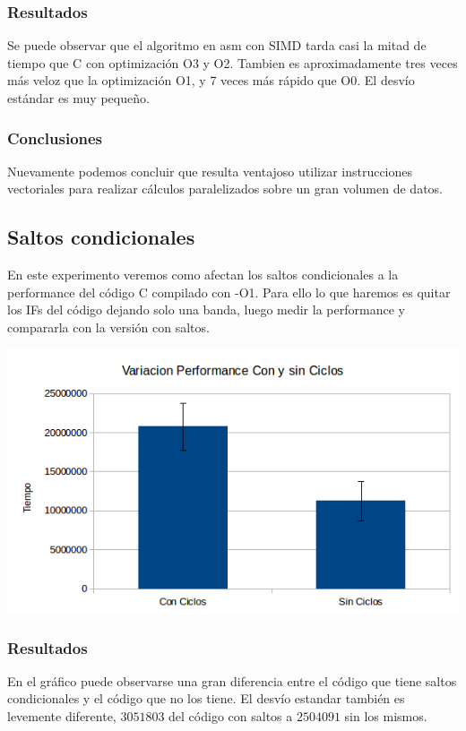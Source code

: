 \documentclass[a4paper]{article}
\begin{document}
\subsubsection{Resultados}
Se puede observar que el algoritmo en asm con SIMD tarda casi la mitad de tiempo que C con optimización O3 y O2. Tambien es aproximadamente tres veces más veloz que la optimización O1, y 7 veces más rápido que O0. El desvío estándar es muy pequeño.

\subsubsection{Conclusiones}

Nuevamente podemos concluir que resulta ventajoso utilizar instrucciones vectoriales para realizar cálculos paralelizados sobre un gran volumen de datos.

\newpage
\subsection{Saltos condicionales}

En este experimento veremos como afectan los saltos condicionales a la performance del código C compilado con -O1. Para ello lo que haremos es quitar los IFs del código dejando solo una banda, luego medir la performance y compararla con la versión con saltos.


  \begin{center}
  \includegraphics[scale=0.66]{Graficos3.1/per.png}
  \end{center}

\subsubsection{Resultados}
En el gráfico puede observarse una gran diferencia entre el código que tiene saltos condicionales y el código que no los tiene. El desvío estandar también es levemente diferente, $3051803$ del código con saltos a $2504091$ sin los mismos.
\end{document}
